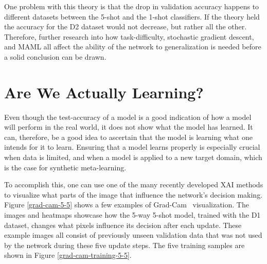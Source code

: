 One problem with this theory is that the drop in validation accuracy happens to different datasets between the 5-shot and the 1-shot classifiers. If the theory held the accuracy for the D2 dataset would not decrease, but rather all the other. Therefore, further research into how task-difficulty, stochastic gradient descent, and MAML all affect the ability of the network to generalization is needed before a solid conclusion can be drawn.

\section{Are We Actually Learning?}
Even though the test-accuracy of a model is a good indication of how a model will perform in the real world, it does not show what the model has learned. It can, therefore, be a good idea to ascertain that the model is learning what one intends for it to learn. Ensuring that a model learns properly is especially crucial when data is limited, and when a model is applied to a new target domain, which is the case for synthetic meta-learning.

To accomplish this, one can use one of the many recently developed \gls{XAI} methods to visualize what parts of the image that influence the network's decision making. Figure \ref{grad-cam-5-5} shows a few examples of Grad-Cam~\cite{gradcam} visualization. The images and heatmaps showcase how the 5-way 5-shot model, trained with the D1 dataset, changes what pixels influence its decision after each update. These example images all consist of previously unseen validation data that was not used by the network during these five update steps. The five training samples are shown in Figure \ref{grad-cam-training-5-5}.

